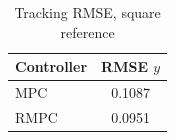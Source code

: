 \begin{table}[t]
\centering
\caption{Tracking RMSE, square reference}
\label{tab:rmse_duffing_square_mpc_rmpc}
\begin{tabular}{lc}
\toprule
Controller & RMSE $y$ \\
\midrule
MPC & 0.1087 \\
RMPC & 0.0951 \\
\bottomrule
\end{tabular}
\end{table}
